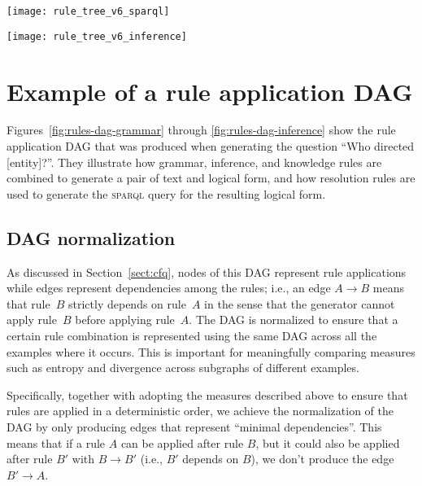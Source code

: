 \documentclass[letterpaper]{article}
\newcommand{\SPARQL}{\textsc{sparql}}
\begin{document}
\begin{figure*}
  \centering
  \texttt{[image: rule\_tree\_v6\_sparql]}
  \caption{The normalized rule application DAG that was produced for ``Who directed [entity]?'' (resolution rules portion, continued from Figure~\ref{fig:rules-dag-grammar}).}
  \label{fig:rules-dag-sparql}
\end{figure*}

\begin{figure*}
  \centering
  \texttt{[image: rule\_tree\_v6\_inference]}
  \caption{The normalized rule application DAG that was produced for ``Who directed [entity]?'' (inference rules portion, continued from Figure~\ref{fig:rules-dag-grammar}).}
  \label{fig:rules-dag-inference}
\end{figure*}

\section{Example of a rule application DAG}
\label{suppl:rules-dag}

Figures~\ref{fig:rules-dag-grammar} through \ref{fig:rules-dag-inference} show the rule application DAG that was produced when generating the question ``Who directed [entity]?''. They illustrate how grammar, inference, and knowledge rules are combined to generate a pair of text and logical form, and how resolution rules are used to generate the \SPARQL{} query for the resulting logical form.

\subsection{DAG normalization}
As discussed in Section~\ref{sect:cfq}, nodes of this DAG represent rule applications while edges represent dependencies among the rules; i.e., an edge $A \rightarrow B$ means that rule~$B$ strictly depends on rule~$A$ in the sense that the generator cannot apply rule~$B$ before applying rule~$A$. The DAG is normalized to ensure that a certain rule combination is represented using the same DAG across all the examples where it occurs. This is important for meaningfully comparing measures such as entropy and divergence across subgraphs of different examples.

Specifically, together with adopting the measures described above to ensure that rules are applied in a deterministic order, we achieve the normalization of the DAG by only producing edges that represent ``minimal dependencies''. This means that if a rule $A$ can be applied after rule $B$, but it could also be applied after rule $B'$ with $B \rightarrow B'$ (i.e., $B'$ depends on $B$), we don't produce the edge $B' \rightarrow A$.
\end{document}
